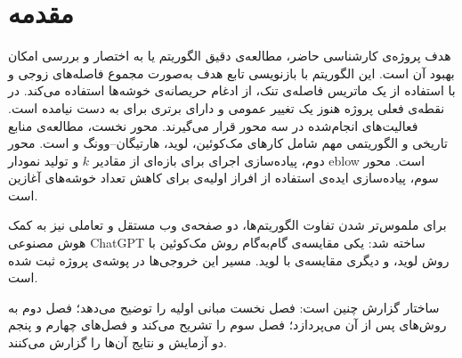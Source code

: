 \chapter*{مقدمه}

هدف پروژه‌ی کارشناسی حاضر، مطالعه‌ی دقیق الگوریتم
 یا به اختصار 
\cite{yuan2026} و بررسی امکان بهبود آن است. این الگوریتم با بازنویسی تابع
هدف  به‌صورت مجموع فاصله‌های زوجی و با استفاده از یک ماتریس
فاصله‌ی تنک، از ادغام حریصانه‌ی خوشه‌ها استفاده می‌کند. در نقطه‌ی فعلی
پروژه هنوز یک تغییر عمومی و دارای برتری برای  به دست نیامده
است.
فعالیت‌های انجام‌شده در سه محور قرار می‌گیرند. محور نخست، مطالعه‌ی منابع
تاریخی و الگوریتمی مهم شامل کارهای مک‌کوئین، لوید، هارتیگان--وونگ و
 است. محور دوم،
پیاده‌سازی اجرای  برای بازه‌ای از مقادیر $k$ و تولید نمودار eblow
است. محور سوم، پیاده‌سازی ایده‌ی استفاده از افراز اولیه‌ی  برای
کاهش تعداد خوشه‌های آغازین  است.

برای ملموس‌تر شدن تفاوت الگوریتم‌ها، دو صفحه‌ی وب مستقل و تعاملی نیز به کمک هوش مصنوعی ChatGPT ساخته
شد: یکی مقایسه‌ی گام‌به‌گام روش مک‌کوئین با روش لوید، و دیگری
مقایسه‌ی  با لوید. مسیر این خروجی‌ها در پوشه‌ی
 پروژه ثبت شده است.

ساختار گزارش چنین است: فصل نخست مبانی اولیه را توضیح
می‌دهد؛ فصل دوم به روش‌های پس از آن می‌پردازد؛ فصل سوم  را تشریح
می‌کند و فصل‌های چهارم و پنجم دو آزمایش و نتایج آن‌ها را
گزارش می‌کنند.
